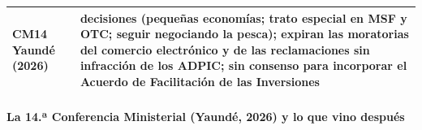 \documentclass[11pt]{article}
\begin{document}
\begin{table}[H]
\begin{tabular}{>{\raggedright\arraybackslash}m{3.2cm}>{\raggedright\arraybackslash}m{11.4cm}}
CM14 Yaundé (2026) & 3 decisiones (pequeñas economías; trato especial en MSF y OTC; seguir negociando la pesca); expiran las moratorias del comercio electrónico y de las reclamaciones sin infracción de los ADPIC; sin consenso para incorporar el Acuerdo de Facilitación de las Inversiones\\
\bottomrule
\end{tabular}
\end{table}

\paragraph{La 14.ª Conferencia Ministerial (Yaundé, 2026) y lo que vino después}
\end{document}
